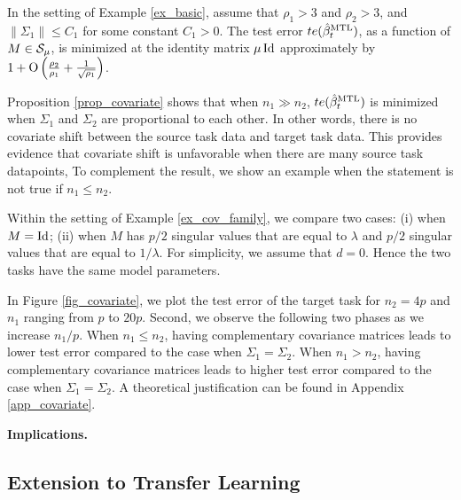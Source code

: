 \begin{proposition}\label{prop_covariate}
	In the setting of Example \ref{ex_basic}, assume that $\rho_1 > 3$ and $\rho_2>3$,
and $\|\Sigma_1\|\le C_1$ for some constant $C_1>0$. %
The test error $te(\hat{\beta}_t^{\text{MTL}})$, as a function of $M\in \mathcal{S}_{\mu}$, is minimized at the identity matrix $\mu\operatorname{Id}$ approximately by
$1+ \operatorname{O}\left(\frac{\rho_2}{\rho_1} + \frac{1}{\sqrt {\rho_1}}\right)$.
\end{proposition}
Proposition \ref{prop_covariate} shows that when $n_1\gg n_2$, $te(\hat{\beta}_t^{\text{MTL}})$ is minimized when $\Sigma_1$ and $\Sigma_2$ are proportional to each other.
In other words, there is no covariate shift between the source task data and target task data.
This provides evidence that covariate shift is unfavorable when there are many source task datapoints,
To complement the result, we show an example when the statement is not true if $n_1 \le n_2$.

\begin{example}\label{ex_complement}
	Within the setting of Example \ref{ex_cov_family}, we compare two cases: (i) when $M = \operatorname{Id}$; (ii) when $M$ has $p/2$ singular values that are equal to $\lambda$ and $p/2$ singular values that are equal to $1 / \lambda$.
	For simplicity, we assume that $d = 0$.
	Hence the two tasks have the same model parameters.

	In Figure \ref{fig_covariate}, we plot the test error of the target task for $n_2 = 4p$ and $n_1$ ranging from $p$ to $20p$.
	Second, we observe the following two phases as we increase $n_1 / p$.
	When $n_1 \le n_2$, having complementary covariance matrices leads to lower test error compared to the case when $\Sigma_1 = \Sigma_2$.
	When $n_1 > n_2$, having complementary covariance matrices leads to higher test error compared to the case when $\Sigma_1 = \Sigma_2$.
	A theoretical justification can be found in Appendix \ref{app_covariate}.
\end{example}


\textbf{Implications.}


\subsection{Extension to Transfer Learning}\label{sec_taskonomy}

